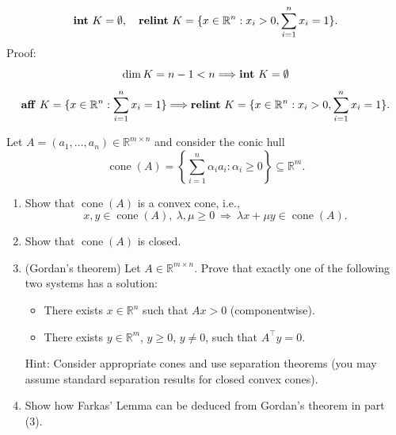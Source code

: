 \documentclass[11pt,letter,notitlepage]{article}
\DeclareMathOperator*{\relint}{\bf relint\,}
\DeclareMathOperator*{\intp}{\bf int\,}
\DeclareMathOperator*{\aff}{\bf aff\,}
\theoremstyle{definition}
\begin{document}
\begin{solution}
\begin{enumerate}[label=(\arabic*)]
\begin{enumerate}[label=(\alph*)]
\[                \intp K = \emptyset, \quad \relint K = \{x \in \mathbb{R}^n : x_i > 0, \sum_{i=1}^n x_i = 1\}.
                \]
                Proof:
                \[
                \dim K = n-1 < n
                \Longrightarrow
                \intp K = \emptyset
                \]
                \[
                \aff K = \{x \in \mathbb{R}^n : \sum_{i=1}^n x_i = 1\}
                \Longrightarrow
                \relint K = \{x \in \mathbb{R}^n : x_i > 0, \sum_{i=1}^n x_i = 1\}.
                \]
            \end{enumerate}
        \end{enumerate}
    \end{solution}

    \newpage

    \begin{exercise}
        Let \(A=(a_{1},\ldots,a_{n})\in\mathbb{R}^{m\times n}\) and consider the conic hull
        \[\operatorname{cone}(A)=\left\{\sum_{i=1}^{n}\alpha_{i}a_{i}:\alpha_{i}\geq 0\right\}\subseteq\mathbb{R}^{m}.\]
        
        \begin{enumerate}[label=(\arabic*)]
        \item Show that \(\operatorname{cone}(A)\) is a convex cone, i.e.,
        \[x,y\in\operatorname{cone}(A),\ \lambda,\mu\geq 0\ \Rightarrow\ \lambda x+\mu y\in\operatorname{cone}(A).\]
        
        \item Show that \(\operatorname{cone}(A)\) is closed.
        
        \item (Gordan's theorem) Let \(A\in\mathbb{R}^{m\times n}\). Prove that exactly one of the following two systems has a solution:
        \begin{itemize}
            \item There exists \(x\in\mathbb{R}^{n}\) such that \(Ax>0\) (componentwise).
            \item There exists \(y\in\mathbb{R}^{m}\), \(y\geq 0\), \(y\neq 0\), such that \(A^{\top}y=0\).
        \end{itemize}
        Hint: Consider appropriate cones and use separation theorems (you may assume standard separation results for closed convex cones).
        
        \item Show how Farkas' Lemma can be deduced from Gordan's theorem in part (3).
        \end{enumerate}
    \end{exercise}
\end{document}
